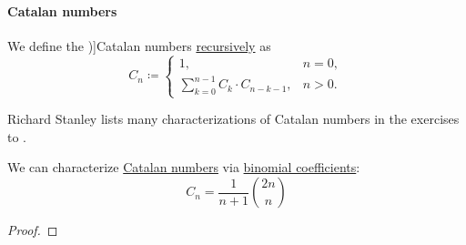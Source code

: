 \paragraph{Catalan numbers}

\begin{definition}\label{def:catalan_number}
  We define the \term[ru=число Каталана (\cite[\S 5.7.4]{Новиков2013ДискретнаяМатематика})]{Catalan numbers} \hyperref[rem:natural_number_recursion]{recursively} as
  \begin{equation}\label{eq:def:catalan_number}
    C_n \coloneqq \begin{cases}
      1,                                    &n = 0, \\
      \sum_{k=0}^{n-1} C_k \cdot C_{n-k-1}, &n > 0.
    \end{cases}
  \end{equation}
\end{definition}
\begin{comments}
  \item Richard Stanley lists many characterizations of Catalan numbers in the exercises to \cite[ch. 6]{Stanley2023EnumCombinatoricsVol2}.
\end{comments}

\begin{proposition}\label{thm:catalan_number_via_binomial_coefficients}
  We can characterize \hyperref[def:catalan_number]{Catalan numbers} via \hyperref[def:binomial_coefficient]{binomial coefficients}:
  \begin{equation}\label{eq:thm:catalan_number_via_binomial_coefficients}
    C_n = \frac 1 {n + 1} \binom {2n} n
  \end{equation}
\end{proposition}
\begin{proof}
\end{proof}

